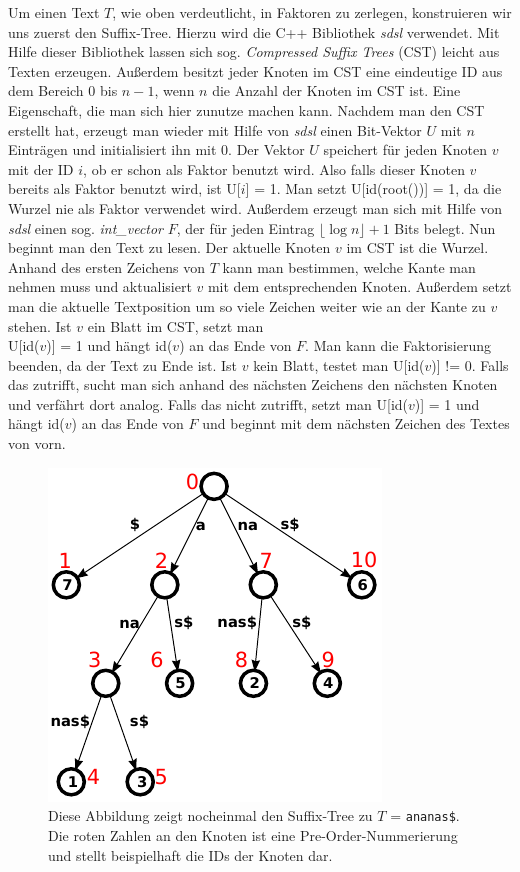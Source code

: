 \documentclass[a4paper,11pt]{scrartcl}%
\theoremstyle{nonumberplain}
\theoremstyle{change}
\theoremstyle{nonumberplain}
\theoremstyle{change}
\theoremstyle{nonumberplain}
\begin{document}
	
		Um einen Text $T$, wie oben verdeutlicht, in Faktoren zu zerlegen, konstruieren wir uns zuerst den Suffix-Tree. Hierzu wird die C++ Bibliothek \textit{sdsl} verwendet. Mit Hilfe dieser Bibliothek lassen sich sog. \textit{Compressed Suffix Trees} (CST) leicht aus Texten erzeugen. Außerdem besitzt jeder Knoten im CST eine eindeutige ID aus dem Bereich 0 bis $n-1$, wenn $n$ die Anzahl der Knoten im CST ist. Eine Eigenschaft, die man sich hier zunutze machen kann. Nachdem man den CST erstellt hat, erzeugt man wieder mit Hilfe von \textit{sdsl} einen Bit-Vektor $U$ mit $n$ Einträgen und initialisiert ihn mit 0. Der Vektor $U$ speichert für jeden Knoten $v$ mit der ID $i$, ob er schon als Faktor benutzt wird. Also falls dieser Knoten $v$ bereits als Faktor benutzt wird, ist U[$i$] = 1. Man setzt U[id(root())] = 1, da die Wurzel nie als Faktor verwendet wird. Außerdem erzeugt man sich mit Hilfe von \textit{sdsl} einen sog. \textit{int\_vector} $F$, der für jeden Eintrag $\lfloor\log n\rfloor + 1$ Bits belegt.
		Nun beginnt man den Text zu lesen. Der aktuelle Knoten $v$ im CST ist die Wurzel. Anhand des ersten Zeichens von $T$ kann man bestimmen, welche Kante man nehmen muss und aktualisiert $v$ mit dem entsprechenden Knoten. Außerdem setzt man die aktuelle Textposition um so viele Zeichen weiter wie an der Kante zu $v$ stehen. Ist $v$ ein Blatt im CST, setzt man \\U[id($v$)] = 1 und hängt id($v$) an das Ende von $F$. Man kann die Faktorisierung beenden, da der Text zu Ende ist. Ist $v$ kein Blatt, testet man U[id($v$)] != 0. Falls das zutrifft, sucht man sich anhand des nächsten Zeichens den nächsten Knoten und verfährt dort analog. Falls das nicht zutrifft, setzt man U[id($v$)] = 1 und hängt id($v$) an das Ende von $F$ und beginnt mit dem nächsten Zeichen des Textes von vorn. 
		\begin{figure}[h]
			\centering
			\includegraphics[scale=0.8]{ananas_suffixTree_inorder}
			\caption{Diese Abbildung zeigt nocheinmal den Suffix-Tree zu $T$ = \texttt{ananas\$}. Die roten Zahlen an den Knoten ist eine Pre-Order-Nummerierung und stellt beispielhaft die IDs der Knoten dar.}
			\label{fig:st_inorder}
		\end{figure}
\end{document}
